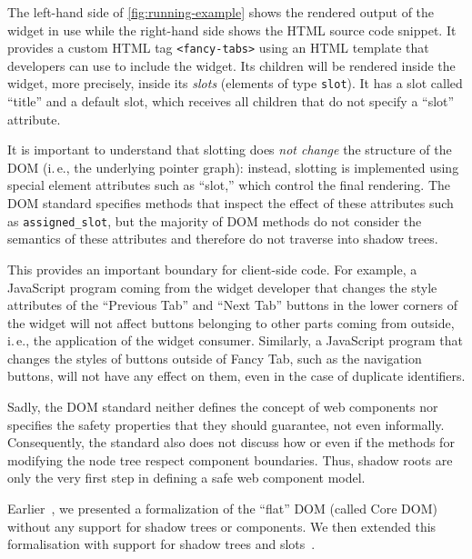 \documentclass[10pt,DIV16,a4paper,abstract=true,twoside=semi,openright]
{scrreprt}
\def\inlinehtml{\lstinline[style=html, columns=fullflexible]}
\newcommand{\ie}{i.\,e.\xspace}
\begin{document}
The left-hand side of \autoref{fig:running-example} shows the rendered
output of the widget in use while the right-hand side shows the HTML
source code snippet.  It provides a custom HTML tag
\inlinehtml{<fancy-tabs>} using an HTML template that developers can
use to include the widget. Its children will be rendered inside the
widget, more precisely, inside its \emph{slots} (elements of type
\inlinehtml{slot}).  It has a slot called ``title'' and a default
slot, which receives all children that do not specify a ``slot''
attribute.

It is important to understand that slotting does \emph{not change} the
structure of the DOM (\ie, the underlying pointer graph): instead,
slotting is implemented using special element attributes such as
``slot,'' which control the final rendering. The DOM standard
specifies methods that inspect the effect of these attributes such as
\texttt{assigned\_slot}, but the majority of DOM methods do not
consider the semantics of these attributes and therefore do not
traverse into shadow trees.

This provides an important boundary for client-side code. For example,
a JavaScript program coming from the widget developer that changes the
style attributes of the ``Previous Tab'' and ``Next Tab'' buttons in the lower
corners of the widget will not affect buttons belonging to other parts
coming from outside, \ie, the application of the widget consumer.
Similarly, a JavaScript program that changes the styles of buttons
outside of Fancy Tab, such as the navigation buttons, will not have
any effect on them, even in the case of duplicate identifiers.

Sadly, the DOM standard neither defines the concept of web components
nor specifies the safety properties that they should guarantee, not
even informally. Consequently, the standard also does not discuss how
or even if the methods for modifying the node tree respect component
boundaries.  Thus, shadow roots are only the very first step in
defining a safe web component model.

Earlier~\cite{brucker.ea:core-dom:2018,brucker.ea:afp-core-sc-dom:2020},
we presented a formalization of the ``flat'' DOM (called Core DOM)
without any support for shadow trees or components.  We then extended
this formalisation with support for shadow trees and
slots~\cite{brucker.ea:afp-shadow-sc-dom:2020}.
\end{document}
